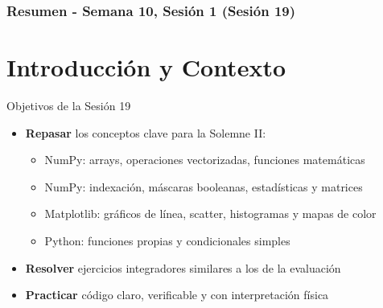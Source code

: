 \documentclass[10pt]{beamer}
\begin{document}
\myfront{}

\begin{frame}
  \titlepage
\end{frame}

\begin{frame}
  \frametitle{Resumen - Semana 10, Sesión 1 (Sesión 19)}
  \tableofcontents
\end{frame}


\section{Introducción y Contexto}

\begin{frame}{Objetivos de la Sesión 19}
  \begin{itemize}
    \item \textbf{Repasar} los conceptos clave para la Solemne II:
      \begin{itemize}
        \item NumPy: arrays, operaciones vectorizadas, funciones matemáticas
        \item NumPy: indexación, máscaras booleanas, estadísticas y matrices
        \item Matplotlib: gráficos de línea, scatter, histogramas y mapas de color
        \item Python: funciones propias y condicionales simples
      \end{itemize}
    \item \textbf{Resolver} ejercicios integradores similares a los de la evaluación
    \item \textbf{Practicar} código claro, verificable y con interpretación física
  \end{itemize}
\end{frame}
\end{document}
